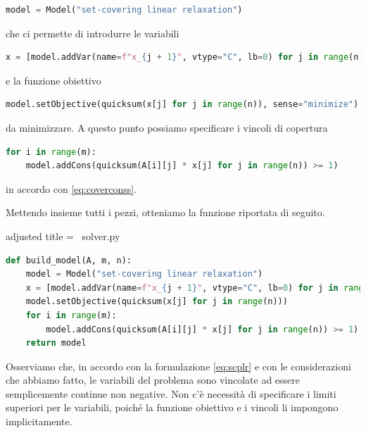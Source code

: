 \begin{inline}
\begin{lstlisting}[style = style2, language=python]
model = Model("set-covering linear relaxation")
\end{lstlisting}
\end{inline}
\noindent
che ci permette di introdurre le variabili
\begin{inline}
\begin{lstlisting}[style = style2, language=python]
x = [model.addVar(name=f"x_{j + 1}", vtype="C", lb=0) for j in range(n)]
\end{lstlisting}
\end{inline}
\noindent
e la funzione obiettivo
\begin{inline}
\begin{lstlisting}[style = style2, language=python]
model.setObjective(quicksum(x[j] for j in range(n)), sense="minimize")
\end{lstlisting}
\end{inline}
\noindent
da minimizzare. A questo punto possiamo specificare i vincoli di copertura
\begin{inline}
\begin{lstlisting}[style = style2, language=python]
for i in range(m):
    model.addCons(quicksum(A[i][j] * x[j] for j in range(n)) >= 1)
\end{lstlisting}
\end{inline}
\noindent
in accordo con \eqref{eq:coverconss}.

Mettendo insieme tutti i pezzi, otteniamo la funzione riportata di seguito.
\begin{code}{adjusted title = {\pyicon\ solver.py}}
\begin{lstlisting}[language=python, style = style, caption={Costruzione del modello per l'algoritmo del simplesso.}]
def build_model(A, m, n):
    model = Model("set-covering linear relaxation")
    x = [model.addVar(name=f"x_{j + 1}", vtype="C", lb=0) for j in range(n)]
    model.setObjective(quicksum(x[j] for j in range(n)))
    for i in range(m):
        model.addCons(quicksum(A[i][j] * x[j] for j in range(n)) >= 1)
    return model
\end{lstlisting}
\end{code}
\noindent
Osserviamo che, in accordo con la formulazione \eqref{eq:scplr} e con le considerazioni che abbiamo fatto, le variabili
del problema sono vincolate ad essere semplicemente continue non negative. Non c'è necessità di specificare i limiti
superiori per le variabili, poiché la funzione obiettivo e i vincoli li impongono implicitamente.

